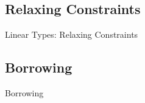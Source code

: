 \documentclass[xcolor=x11names,compress]{beamer}
\renewcommand{\(}{\begin{columns}}
\renewcommand{\)}{\end{columns}}
\newcommand{\<}[1]{\begin{column}{#1}}
\renewcommand{\>}{\end{column}}
\begin{document}
\subsection{Relaxing Constraints}
\begin{frame}{Linear Types: Relaxing Constraints}
    
\end{frame}

\subsection{Borrowing}
\begin{frame}{Borrowing}
    
\end{frame}
\end{document}

